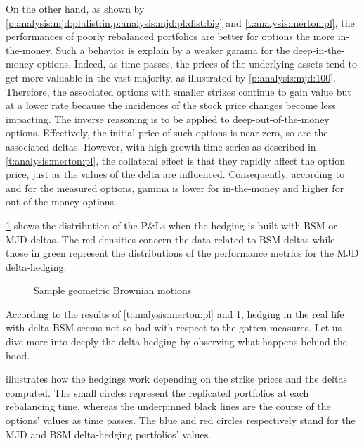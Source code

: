 \documentclass[12pt]{report}
\begin{document}
On the other hand, as shown by \cref{p:analysis:mjd:pl:dist:in,p:analysis:mjd:pl:dist:big} and \cref{t:analysis:merton:pl}, the performances of poorly rebalanced portfolios are better for options the more in-the-money. 
Such a behavior is explain by a weaker gamma for the deep-in-the-money options.
Indeed, as time passes, the prices of the underlying assets tend to get more valuable in the vast majority, as illustrated by \cref{p:analysis:mjd:100}. 
Therefore, the associated options with smaller strikes continue to gain value but at a lower rate because the incidences of the stock price changes become less impacting. 
The inverse reasoning is to be applied to deep-out-of-the-money options. 
Effectively, the initial price of such options is near zero, so are the associated deltas.
However, with high growth time-series as described in \cref{t:analysis:merton:pl}, the collateral effect is that they rapidly affect the option price, just as the values of the delta are influenced.
Consequently, according to and for the measured options, gamma is lower for in-the-money and higher for out-of-the-money options.




\cref{p:analysis:mjd:pl:dist:deltas} shows the distribution of the P\&Ls when the hedging is built with BSM or MJD deltas. The red densities concern the data related to BSM deltas while those in green represent the distributions of the performance metrics for the MJD delta-hedging.

\begin{figure}[h]
  \centering
  
  \caption{Sample geometric Brownian motions}
  \label{p:analysis:mjd:pl:dist:deltas}
\end{figure}

According to the results of \cref{t:analysis:merton:pl} and \cref{p:analysis:mjd:pl:dist:deltas}, hedging in the real life with delta BSM seems not so bad with respect to the gotten measures.
Let us dive more into deeply the delta-hedging by observing what happens behind the hood.

 illustrates how the hedgings work depending on the strike prices and the deltas computed.
The small circles represent the replicated portfolios at each rebalancing time, whereas the underpinned black lines are the course of the options' values as time passes. The blue and red circles respectively stand for the MJD and BSM delta-hedging portfolios' values.
\end{document}
